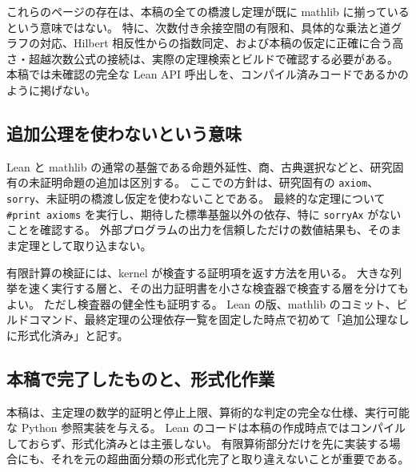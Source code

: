 \documentclass[11pt,a4paper]{ltjsarticle}
\numberwithin{equation}{section}
\theoremstyle{definition}
\begin{document}
これらのページの存在は、本稿の全ての橋渡し定理が既に mathlib に揃っているという意味ではない。
特に、次数付き余接空間の有限和、具体的な乗法と道グラフの対応、Hilbert 相反性からの指数同定、および本稿の仮定に正確に合う高さ・超越次数公式の接続は、実際の定理検索とビルドで確認する必要がある。
本稿では未確認の完全な Lean API 呼出しを、コンパイル済みコードであるかのように掲げない。

\subsection{追加公理を使わないという意味}
Lean と mathlib の通常の基盤である命題外延性、商、古典選択などと、研究固有の未証明命題の追加は区別する\cite{lean-axioms}。
ここでの方針は、研究固有の \texttt{axiom}、\texttt{sorry}、未証明の橋渡し仮定を使わないことである。
最終的な定理について \texttt{\#print axioms} を実行し、期待した標準基盤以外の依存、特に \texttt{sorryAx} がないことを確認する。
外部プログラムの出力を信頼しただけの数値結果も、そのまま定理として取り込まない。

有限計算の検証には、kernel が検査する証明項を返す方法を用いる。
大きな列挙を速く実行する層と、その出力証明書を小さな検査器で検査する層を分けてもよい。
ただし検査器の健全性も証明する。
Lean の版、mathlib のコミット、ビルドコマンド、最終定理の公理依存一覧を固定した時点で初めて「追加公理なしに形式化済み」と記す。

\subsection{本稿で完了したものと、形式化作業}
本稿は、主定理の数学的証明と停止上限、算術的な判定の完全な仕様、実行可能な Python 参照実装を与える。
Lean のコードは本稿の作成時点ではコンパイルしておらず、形式化済みとは主張しない。
有限算術部分だけを先に実装する場合にも、それを元の超曲面分類の形式化完了と取り違えないことが重要である。

\appendix
\end{document}
